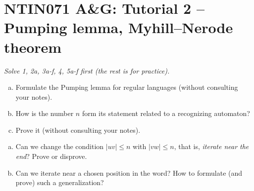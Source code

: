 \documentclass[a4paper,12pt]{amsart}
\begin{document}

\section*{NTIN071 A\&G: Tutorial 2 -- Pumping lemma, Myhill--Nerode theorem}


\medskip

\noindent\emph{Solve 1, 2a, 3a-f, 4, 5a-f  first (the rest is for practice).}

\medskip

\medskip\begin{problem}
    
    \begin{enumerate}[(a)]\setlength\itemsep{12pt}
        \item Formulate the Pumping lemma for regular languages (without consulting your notes).
        \item How is the number $n$ form its statement related to a recognizing automaton?
        \item Prove it (without consulting your notes).        
    \end{enumerate}

\end{problem}


\medskip\begin{problem}
    
    \begin{enumerate}[(a)]\setlength\itemsep{12pt}
        \item Can we change the condition $|uv|\leq n$ with $|vw|\leq n$, that is, \emph{iterate near the end}? Prove or disprove.
        \item Can we iterate near a chosen position in the word? How to formulate (and prove) such a generalization?
    \end{enumerate}
    
\end{problem}
    
\end{document}
